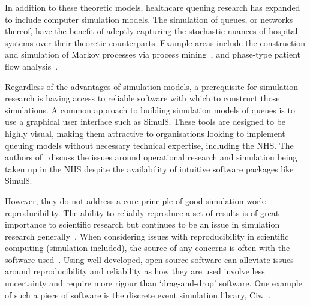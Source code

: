 In addition to these theoretic models, healthcare queuing research has expanded
to include computer simulation models. The simulation of queues, or networks
thereof, have the benefit of adeptly capturing the stochastic nuances of
hospital systems over their theoretic counterparts. Example areas include the
construction and simulation of Markov processes via process
mining~\cite{Arnolds2018,Prokofyeva2020,Rebuge2012}, and phase-type patient
flow analysis~\cite{Bhattacharjee2014,McClean2011}.

Regardless of the advantages of simulation models, a prerequisite for simulation
research is having access to reliable software with which to construct those
simulations. A common approach to building simulation models of queues is to use
a graphical user interface such as Simul8. These tools are designed to be highly
visual, making them attractive to organisations looking to implement queuing
models without necessary technical expertise, including the NHS. The authors
of~\cite{Brailsford2013} discuss the issues around operational research and
simulation being taken up in the NHS despite the availability of intuitive
software packages like Simul8.

However, they do not address a core principle of good simulation work:
reproducibility. The ability to reliably reproduce a set of results is of great
importance to scientific research but continues to be an issue in simulation
research generally~\cite{Fitzpatrick2019,Taylor2018}. When considering issues
with reproducibility in scientific computing (simulation included), the source
of any concerns is often with the software used~\cite{Ivie2018}. Using
well-developed, open-source software can alleviate issues around reproducibility
and reliability as how they are used involve less uncertainty and require more
rigour than `drag-and-drop' software. One example of such a piece of software is
the discrete event simulation library, Ciw~\cite{Palmer2019}.

